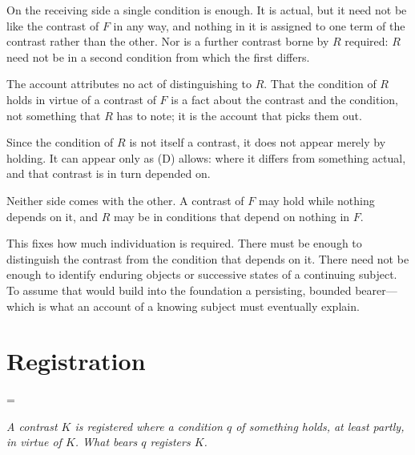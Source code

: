 \documentclass[11pt,a4paper,oneside]{scrartcl}
\makeatletter
\newenvironment{thesis}[2][]
  {\@beginparpenalty=\@M %
   \begin{list}{}{\setlength{\leftmargin}{2.2em}\setlength{\rightmargin}{2.2em}
                  \setlength{\topsep}{.9\baselineskip plus .2\baselineskip}}%
   \item\relax{\upshape\if\relax\detokenize{#1}\relax\else(#1)\enspace\fi\scshape\MakeLowercase{#2}}\par\nopagebreak\vspace{.2\baselineskip}\itshape\ignorespaces}
  {\end{list}}
\newcommand{\F}{\ensuremath{F}}
\newcommand{\R}{\ensuremath{R}}
\makeatother
\begin{document}
On the receiving side a single condition is enough. It is actual, but it need not be like the
contrast of \F{} in any way, and nothing in it is assigned to one term of the contrast rather than
the other. Nor is a further contrast borne by \R{} required: \R{} need not be in a second condition
from which the first differs.

The account attributes no act of distinguishing to \R. That the condition of \R{} holds in virtue
of a contrast of \F{} is a fact about the contrast and the condition, not something that \R{} has
to note; it is the account that picks them out.

Since the condition of \R{} is not itself a contrast, it does not appear merely by holding. It can
appear only as (D) allows: where it differs from something actual, and that contrast is in turn
depended on.

Neither side comes with the other. A contrast of \F{} may hold while nothing depends on it, and
\R{} may be in conditions that depend on nothing in \F.

This fixes how much individuation is required. There must be enough to distinguish the
contrast from the condition that depends on it. There need not be enough to identify enduring
objects or successive states of a continuing subject. To assume that would build into the
foundation a persisting, bounded bearer---which is what an account of a knowing subject must
eventually explain.

\section{Registration}\label{sec:reg}

\begin{thesis}{Definition of registration}
  A contrast $K$ is registered where a condition $q$ of something holds, at least partly, in virtue
  of $K$. What bears $q$ registers $K$.
\end{thesis}
\end{document}
